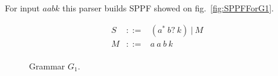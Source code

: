 \documentclass[runningheads,a4paper]{llncs}
\begin{document}
For input $ aabk $ this parser builds SPPF showed on fig.~\ref{fig:SPPFForG1}.

\begin{figure}[H]
    $$
    \begin{array}{crcl}
    S& ::= &(a^{*}\ b?\ k)\ |\ M \\
    M& ::= &a\ a\ b\ k \\
    \end{array}
    $$
    \caption{Grammar $G_1$.}
    \label{fig:grammarG1}
\end{figure}
\begin{figure}[H]
    \centering
    ~
\end{figure}
\end{document}
